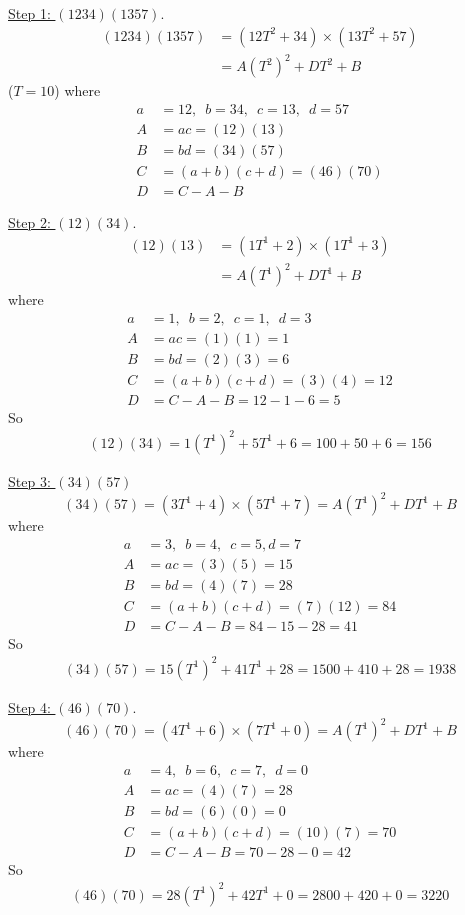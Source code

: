 \underline{Step 1: $(1234)(1357)$}.
\begin{align*}
(1234)(1357)
&= (12T^2 + 34) \times (13T^2 + 57) \\
&= A (T^2)^2 + D T^2 + B
\end{align*}
($T = 10$)
where
\begin{align*}
a &= 12, \,\,\, b = 34, \,\,\, c = 13, \,\,\, d = 57 \\
A &= a c = (12)(13)\\
B &= b d = (34)(57)\\
C &= (a + b) (c + d) = (46)(70)\\
D &= C - A - B
\end{align*}

\underline{Step 2: $(12)(34)$}.
\begin{align*}
(12)(13) 
&= (1T^1 + 2) \times (1T^1 + 3) \\
&= A (T^1)^2 + D T^1 + B 
\end{align*}
where
\begin{align*}
a &= 1, \,\,\, b = 2, \,\,\, c = 1, \,\,\, d = 3 \\
A &= a c = (1)(1) = 1\\
B &= b d = (2)(3) = 6\\
C &= (a + b) (c + d) = (3)(4) = 12\\
D &= C - A - B = 12 - 1 - 6 = 5
\end{align*}
So
\begin{align*}
(12)(34) = 1(T^1)^2 + 5T^1 + 6 = 100 + 50 + 6 = 156 
\end{align*}

\underline{Step 3: $(34)(57)$}
\[
(34)(57) = (3T^1 + 4) \times (5T^1 + 7) =  A(T^1)^2 + DT^1 + B 
\]
where
\begin{align*}
a &= 3, \,\,\, b = 4, \,\,\, c = 5, d = 7 \\
A &= a c = (3)(5) = 15\\
B &= b d = (4)(7) = 28\\
C &= (a + b) (c + d) = (7)(12) = 84\\
D &= C - A - B = 84 - 15 - 28 = 41
\end{align*}
So
\begin{align*}
(34)(57) = 15(T^1)^2 + 41T^1 + 28 = 1500 + 410 + 28 = 1938 
\end{align*}

\underline{Step 4: $(46)(70)$}.
\[
(46)(70) 
= (4T^1 + 6) \times (7T^1 + 0) = A(T^1)^2 + DT^1 + B 
\]
where
\begin{align*}
a &= 4, \,\,\, b = 6, \,\,\, c = 7, \,\,\, d = 0 \\
A &= a c = (4)(7) = 28\\
B &= b d = (6)(0) = 0\\
C &= (a + b) (c + d) = (10)(7) = 70\\
D &= C - A - B = 70 - 28 - 0 = 42
\end{align*}
So
\begin{align*}
(46)(70) = 28(T^1)^2 + 42T^1 + 0 = 2800 + 420 + 0 = 3220 
\end{align*}

